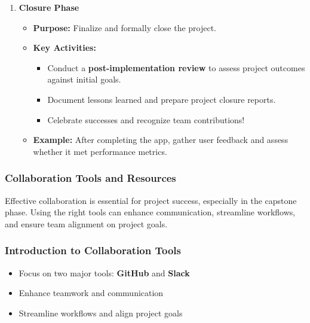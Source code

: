 \documentclass[aspectratio=169]{beamer}
\begin{document}
\begin{frame}[fragile]
\begin{enumerate}
        \item \textbf{Closure Phase}
            \begin{itemize}
                \item \textbf{Purpose:} Finalize and formally close the project.
                \item \textbf{Key Activities:}
                    \begin{itemize}
                        \item Conduct a \textbf{post-implementation review} to assess project outcomes against initial goals.
                        \item Document lessons learned and prepare project closure reports.
                        \item Celebrate successes and recognize team contributions!
                    \end{itemize}
                \item \textbf{Example:} After completing the app, gather user feedback and assess whether it met performance metrics.
            \end{itemize}
    \end{enumerate}
\end{frame}

\begin{frame}[fragile]
    \frametitle{Collaboration Tools and Resources}
    Effective collaboration is essential for project success, especially in the capstone phase. Using the right tools can enhance communication, streamline workflows, and ensure team alignment on project goals.
\end{frame}

\begin{frame}[fragile]
    \frametitle{Introduction to Collaboration Tools}
    \begin{itemize}
        \item Focus on two major tools: \textbf{GitHub} and \textbf{Slack}
        \item Enhance teamwork and communication
        \item Streamline workflows and align project goals
    \end{itemize}
\end{frame}
\end{document}
